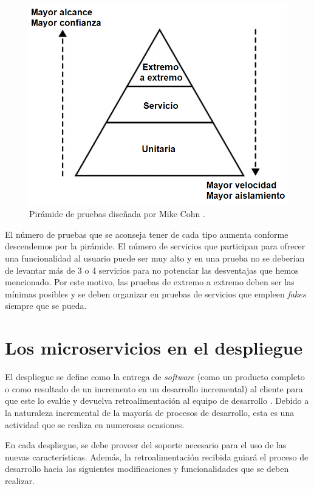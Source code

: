 \documentclass[11pt,spanish,listoffigures]{tfgetsinf}
\begin{document}
\begin{figure}[h]
\centering
\includegraphics[scale=0.5]{Cohn_Pyramid_ES}
\caption{Pirámide de pruebas diseñada por Mike Cohn \cite{Cohn2010}.}
\label{fig:Cohn_Pyramid_ES}
\end{figure}

El número de pruebas que se aconseja tener de cada tipo aumenta conforme descendemos por la pirámide. El número de servicios que participan para ofrecer una funcionalidad al usuario puede ser muy alto y en una prueba no se deberían de levantar más de 3 o 4 servicios para no potenciar las desventajas que hemos mencionado. Por este motivo, las pruebas de extremo a extremo deben ser las mínimas posibles y se deben organizar en pruebas de servicios que empleen \textit{fakes} siempre que se pueda.

\section{Los microservicios en el despliegue}

El despliegue se define como la entrega de \textit{software} (como un producto completo o como resultado de un incremento en un desarrollo incremental) al cliente para que este lo evalúe y devuelva retroalimentación al equipo de desarrollo \cite{Pressman}. Debido a la naturaleza incremental de la mayoría de procesos de desarrollo, esta es una actividad que se realiza en numerosas ocasiones. 

En cada despliegue, se debe proveer del soporte necesario para el uso de las nuevas características. Además, la retroalimentación recibida guiará el proceso de desarrollo hacia las siguientes modificaciones y funcionalidades que se deben realizar.
\end{document}
